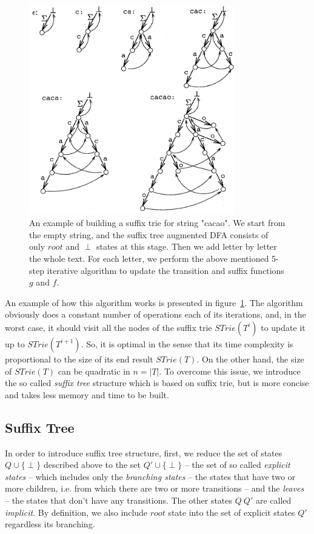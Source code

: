 \documentclass[paper=a4, fontsize=11pt]{scrartcl} %
\numberwithin{equation}{section} %
\numberwithin{figure}{section} %
\numberwithin{table}{section} %
\begin{document}
\begin{figure}[h!]
\centering
\includegraphics[width=0.8\textwidth]{figures/suffix-trie-eg.png}
\caption{An example of building a suffix trie for string "cacao". We start from the empty string, and the suffix tree augmented DFA consists of only $root$ and $\perp$ states at this stage. Then we add letter by letter the whole text. For each letter, we perform the above mentioned 5-step iterative algorithm to update the transition and suffix functions $g$ and $f$.}
\label{fig:siffix-trie}
\end{figure}

An example of how this algorithm works is presented in figure~\ref{fig:siffix-trie}. The algorithm obviously does a constant number of operations each of its iterations, and, in the worst case, it should visit all the nodes of the suffix trie $STrie(T^i)$ to update it up to $STrie(T^{i+1})$. So, it is optimal in the sense that its time complexity is proportional to the size of its end result $STrie(T)$. On the other hand, the size of $STrie(T)$ can be quadratic in $n = |T|$. To overcome this issue, we introduce the so called \textit{suffix tree} structure which is based on suffix trie, but is more concise and takes less memory and time to be built.

\subsection{Suffix Tree}
In order to introduce suffix tree structure, first, we reduce the set of states $Q \cup \{\perp\}$ described above to the set $Q' \cup \{\perp\}$ -- the set of so called \textit{explicit states} -- which includes only the \textit{branching states} -- the states that have two or more children, i.e. from which there are two or more transitions -- and the \textit{leaves} -- the states that don't have any transitions. The other states $Q \ Q'$ are called \textit{implicit}. By definition, we also include $root$ state into the set of explicit states $Q'$ regardless its branching.\\
\end{document}
